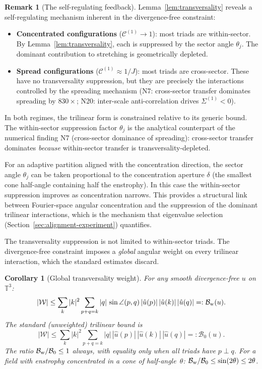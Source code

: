 \documentclass[11pt]{article}
\newtheorem{corollary}[theorem]{Corollary}
\theoremstyle{definition}
\newtheorem{remark}[theorem]{Remark}
\newcommand{\T}{\mathbb{T}}
\newcommand{\cC}{\mathcal{C}}
\newcommand{\cB}{\mathcal{B}}
\begin{document}
\begin{remark}[The self-regulating feedback]
\label{rem:feedback}
Lemma~\ref{lem:transversality} reveals a
self-regulating mechanism inherent in the
divergence-free constraint:
\begin{itemize}[leftmargin=2em]
\item \textbf{Concentrated configurations}
  ($\cC^{(1)}\to 1$): most triads are within-sector.
  By Lemma~\ref{lem:transversality}, each is
  suppressed by the sector angle $\theta_j$.
  The dominant contribution to stretching is
  geometrically depleted.
\item \textbf{Spread configurations}
  ($\cC^{(1)}\approx 1/J$): most triads are
  cross-sector.  These have no transversality
  suppression, but they are precisely the
  interactions controlled by the spreading mechanism
  (N7: cross-sector transfer dominates spreading
  by $830\times$; N20: inter-scale anti-correlation
  drives $\Sigma^{(1)}<0$).
\end{itemize}
In both regimes, the trilinear form is constrained
relative to its generic bound.  The
within-sector suppression factor $\theta_j$ is the
analytical counterpart of the numerical finding N7
(cross-sector dominance of spreading): cross-sector
transfer dominates \emph{because} within-sector
transfer is transversality-depleted.

For an adaptive partition aligned with the
concentration direction, the sector angle $\theta_j$
can be taken proportional to the concentration
aperture $\delta$ (the smallest cone half-angle
containing half the enstrophy).  In this case
the within-sector suppression improves as
concentration narrows.
This provides a structural link between
Fourier-space angular concentration and the
suppression of the dominant trilinear interactions,
which is the mechanism that eigenvalue selection
(Section~\ref{sec:alignment-experiment}) quantifies.
\end{remark}

The transversality suppression is not limited to
within-sector triads.  The divergence-free constraint
imposes a \emph{global} angular weight on every
trilinear interaction, which the standard estimates
discard.

\begin{corollary}[Global transversality weight]
\label{cor:global-transversality}
For any smooth divergence-free $u$ on $\T^3$:
\begin{equation}\label{eq:W-weighted}
|\mathcal{W}| \leq \sum_k |k|^2
\sum_{p+q=k} |q|\,\sin\angle(p,q)\,
|\hat u(p)|\,|\hat u(k)|\,|\hat u(q)|
=: \cB_{\rm w}(u).
\end{equation}
The standard (unweighted) trilinear bound is
\begin{equation}\label{eq:W-unweighted}
|\mathcal{W}| \leq \sum_k |k|^2
\sum_{p+q=k} |q|\,|\hat u(p)|\,|\hat u(k)|\,|\hat u(q)|
=: \cB_0(u).
\end{equation}
The ratio $\cB_{\rm w}/\cB_0 \leq 1$ always,
with equality only when all triads have
$p\perp q$.  For a field with enstrophy
concentrated in a cone of half-angle~$\theta$:
$\cB_{\rm w}/\cB_0 \leq \sin(2\theta)
\leq 2\theta$.
\end{corollary}
\end{document}
